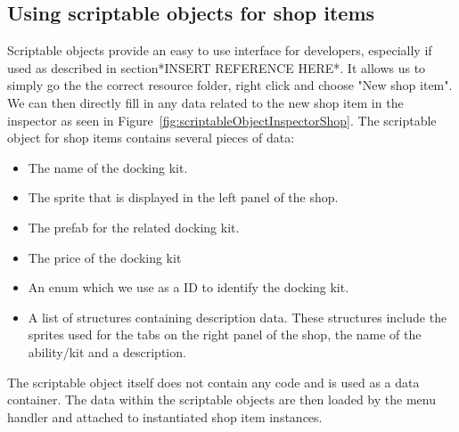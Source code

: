 \subsection{Using scriptable objects for shop items}
Scriptable objects provide an easy to use interface for developers, especially if used as described in section*INSERT REFERENCE HERE*. It allows us to simply go the the correct resource folder, right click and choose "New shop item". We can then directly fill in any data related to the new shop item in the inspector as seen in Figure~\ref{fig:scriptableObjectInspectorShop}. 
The scriptable object for shop items contains several pieces of data:
\begin{itemize}
    \item The name of the docking kit.
    \item The sprite that is displayed in the left panel of the shop.
    \item The prefab for the related docking kit.
    \item The price of the docking kit
    \item An enum which we use as a ID to identify the docking kit.
    \item A list of structures containing description data. These structures include the sprites used for the tabs on the right panel of the shop, the name of the ability/kit and a description. 
\end{itemize}

The scriptable object itself does not contain any code and is used as a data container. The data within the scriptable objects are then loaded by the menu handler and attached to instantiated shop item instances. 

